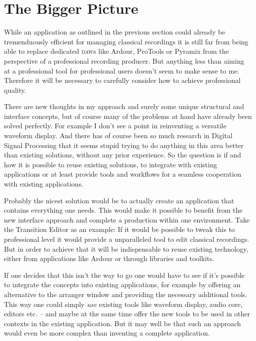 \documentclass[11pt,a4paper]{article}
\begin{document}
\section{The Bigger Picture}
While an application as outlined in the previous section could already be tremenduously efficient for managing classical recordings it is still far from being able to replace dedicated \textsc{daw}s like Ardour, ProTools or Pyramix from the perspective of a professional recording producer.
But anything less than aiming at a professional tool for professional users doesn't seem to make sense to me.
Therefore it will be necessary to carefully consider how to achieve professional quality.

There are new thoughts in my approach and surely some unique structural and interface concepts, but of course many of the problems at hand have already been solved perfectly.
For example I don't see a point in reinventing a versatile waveform display.
And there has of course been so much research in Digital Signal Processing that it seems stupid trying to do anything in this area better than existing solutions, without any prior experience.
So the question is if and how it is possible to reuse existing solutions, to integrate with existing applications or at least provide tools and workflows for a seamless cooperation with existing applications.

Probably the nicest solution would be to actually create an application that contains everything one needs.
This would make it possible to benefit from the new interface approach and complete a production within one environment.
Take the Transition Editor as an example: If it would be possible to tweak this to professional level it would provide a unparalleled tool to edit classical recordings.
But in order to achieve that it will be indispensable to reuse existing technology, either from applications like Ardour or through libraries and toolkits.

If one decides that this isn't the way to go one would have to see if it's possible to integrate the concepts into existing applications, for example by offering an alternative to the arranger window and providing the necessary additional tools.
This way one could simply \emph{use} existing tools like waveform display, audio core, editors etc. -- and maybe at the same time offer the new tools to be used in other contexts in the existing application.
But it may well be that such an approach would even be more complex than inventing a complete application.
\end{document}
